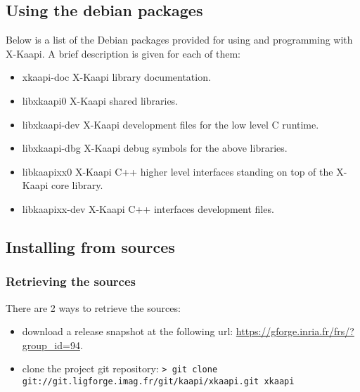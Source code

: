 \documentclass{article}
\newcommand{\kaapi}{\textsc{X}-Kaapi\xspace}
\begin{document}
\subsection{Using the debian packages}
Below is a list of the Debian packages provided for
using and programming with \kaapi. A brief description
is given for each of them:
\begin{itemize}
\item{xkaapi-doc}\newline
\kaapi library documentation.
\item{libxkaapi0}\newline
\kaapi shared libraries.
\item{libxkaapi-dev}\newline
\kaapi development files for the low level C runtime.
\item{libxkaapi-dbg}\newline
\kaapi debug symbols for the above libraries.
\item{libkaapixx0}\newline
\kaapi C++ higher level interfaces standing on top of
the \kaapi core library.
\item{libkaapixx-dev}\newline
\kaapi C++ interfaces development files.
\end{itemize}

\subsection{Installing from sources}

\subsubsection{Retrieving the sources}
There are 2 ways to retrieve the sources:
\begin{itemize}
\item download a release snapshot at the following url:\newline
\url{https://gforge.inria.fr/frs/?group_id=94}.
\item clone the project git repository:\newline
\verb+> git clone git://git.ligforge.imag.fr/git/kaapi/xkaapi.git xkaapi+
\end{itemize}
\end{document}
